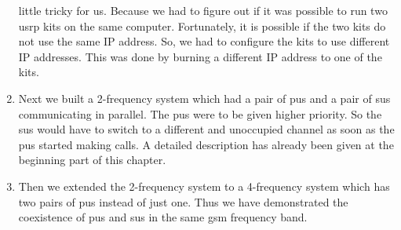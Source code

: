\begin{enumerate}
    little tricky for us. Because we had to figure out if it was possible to
    run two \gls{usrp} kits on the same computer. Fortunately, it is possible if the
    two kits do not use the same IP address. So, we had to configure the kits
    to use different IP addresses. This was done by burning a different IP 
    address to one of the kits.
    \item Next we built a 2-frequency system which had a pair of \glspl{pu}
    and a pair of \glspl{su} communicating in parallel. The \glspl{pu} 
    were to be given higher priority. So the \glspl{su} would have
    to switch to a different and unoccupied channel as soon as the \glspl{pu}
    started making calls. A detailed description has already been given
    at the beginning part of this chapter.
    \item Then we extended the 2-frequency system to a 4-frequency system
    which has two pairs of \glspl{pu} instead of just one. Thus we have 
    demonstrated the coexistence of \glspl{pu} and \glspl{su} in the 
    same \gls{gsm} frequency band.
\end{enumerate}



